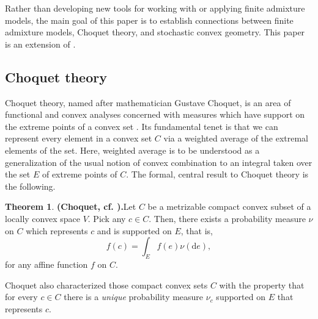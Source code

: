 \documentclass[12pt, reqno]{amsart}
\theoremstyle{definition}
\newtheorem{theorem}{Theorem}%
\begin{document}
Rather than developing new tools for working with or applying finite admixture models, the main goal of this paper is to establish connections between finite admixture models, Choquet theory, and stochastic convex geometry. This paper is an extension of \cite[Chapter 2]{thesis}.



\subsection{Choquet theory}
Choquet theory, named after mathematician Gustave Choquet, is an area of functional and convex analyses concerned with measures which have support on the extreme points of a convex set \cite{phelps1}. Its fundamental tenet is that we can represent every element in a convex set $C$ via a weighted average of the extremal elements of the set. Here, weighted average is to be understood as a generalization of the usual notion of convex combination to an integral taken over the set $E$ of extreme points of $C$. The formal, central result to Choquet theory is the following.

\begin{theorem}{\textbf{(Choquet, cf. \cite[Theorem, page 14]{phelps1}).}}\label{choq1}
Let $C$ be a metrizable compact convex subset of a locally convex space $V$. Pick any $c \in C$. Then, there exists a probability measure $\nu$ on $C$ which represents $c$ and is supported on $E$, that is,
$$f(c)=\int_E f(e) \nu(\text{d}e),$$
for any affine function $f$ on $C$.
\end{theorem}

Choquet also characterized those compact convex sets $C$ with the property that for every $c \in C$ there is a \textit{unique} probability measure $\nu_c$ supported on $E$ that represents $c$. 
\end{document}
